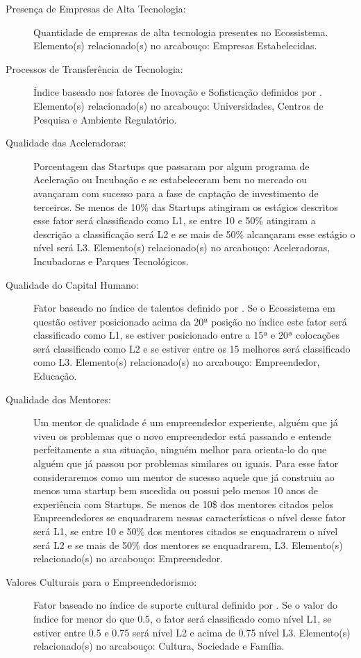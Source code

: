 \begin{description}
  \item [Presença de Empresas de Alta Tecnologia:] Quantidade de empresas de alta tecnologia presentes no Ecossistema. Elemento(s) relacionado(s) no arcabouço: Empresas Estabelecidas.
  
  \item [Processos de Transferência de Tecnologia:] Índice baseado nos fatores de Inovação e Sofisticação definidos por . Elemento(s) relacionado(s) no arcabouço: Universidades, Centros de Pesquisa e Ambiente Regulatório.
  
  \item [Qualidade das Aceleradoras:] Porcentagem das Startups que passaram por algum programa de Aceleração ou Incubação e se estabeleceram bem no mercado ou avançaram com sucesso para a fase de captação de investimento de terceiros. Se menos de 10\% das Startups atingiram os estágios descritos esse fator será classificado como L1, se entre 10 e 50\% atingiram a descrição a classificação será L2 e se mais de 50\% alcançaram esse estágio o nível será L3. Elemento(s) relacionado(s) no arcabouço: Aceleradoras, Incubadoras e Parques Tecnológicos.
  
  \item [Qualidade do Capital Humano:] Fator baseado no índice de talentos definido por . Se o Ecossistema em questão estiver posicionado acima da 20ª posição no índice este fator será classificado como L1, se estiver posicionado entre a 15ª e 20ª colocações será classificado como L2 e se estiver entre os 15 melhores será classificado como L3. Elemento(s) relacionado(s) no arcabouço: Empreendedor, Educação.
  
  \item [Qualidade dos Mentores:] Um mentor de qualidade é um empreendedor experiente, alguém que já viveu os problemas que o novo empreendedor está passando e entende perfeitamente a sua situação, ninguém melhor para orienta-lo do que alguém que já passou por problemas similares ou iguais. Para esse fator consideraremos como um mentor de sucesso aquele que já construiu ao menos uma startup bem sucedida ou possui pelo menos 10 anos de experiência com Startups. Se menos de 10\$ dos mentores citados pelos Empreendedores se enquadrarem nessas características o nível desse fator será L1, se entre 10 e 50\% dos mentores citados se enquadrarem o nível será L2 e se mais de 50\% dos mentores se enquadrarem, L3. Elemento(s) relacionado(s) no arcabouço: Empreendedor.
  
  \item [Valores Culturais para o Empreendedorismo:] Fator baseado no índice de suporte cultural definido por . Se o valor do índice for menor do que 0.5, o fator será classificado como nível L1, se estiver entre 0.5 e 0.75 será nível L2 e acima de 0.75 nível L3. Elemento(s) relacionado(s) no arcabouço: Cultura, Sociedade e Família.
\end{description}


